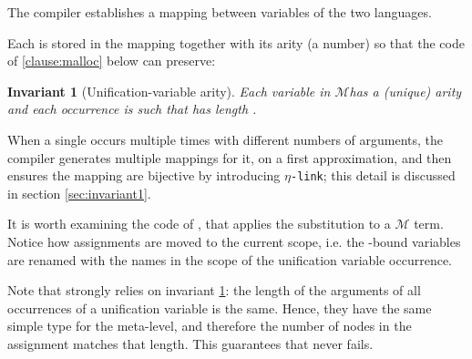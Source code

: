 \documentclass[sigconf,natbib=false,review]{acmart}
\newtheorem{invariant}{Invariant}
\newcommand{\linkMacro}[1]{\ensuremath{#1}\texttt{-link}\xspace}
\newcommand{\linketa} {\linkMacro{\eta}}
\newcommand{\Fo}{\texorpdfstring{\ensuremath{\mathcal{O}}\xspace}{O}}
\newcommand{\Ho}{\texorpdfstring{\ensuremath{\mathcal{M}}\xspace}{M}}
\begin{document}
The compiler establishes a mapping between variables of the two languages.



\noindent
Each  is stored in the mapping together with
its arity (a number) so that the code of \ref{clause:malloc} below can preserve:

\begin{invariant}[Unification-variable arity]\label{inv:uvaarity}
  Each variable 
  in \Ho has a (unique) arity  and each occurrence
   is such that  has length .
\end{invariant}



\noindent
When a single  occurs multiple times with different numbers
of arguments, the compiler generates multiple mappings for it, on a first
approximation, and then ensures the mapping are bijective by introducing
\linketa; this detail is discussed in section \ref{sec:invariant1}.

% 
It is worth examining the code of , that
applies the substitution to a \Ho{} term. Notice how assignments are moved
to the current scope, i.e. the -bound variables are renamed
with the names in the scope of the unification variable occurrence.



\noindent
Note that  strongly relies on invariant \ref{inv:uvaarity}: the length
of the arguments of all occurrences of a unification variable is the same. Hence,
they have the same simple type for the meta-level, and therefore the number of
 nodes in the assignment matches that length.
This guarantees that  never fails.
\end{document}
